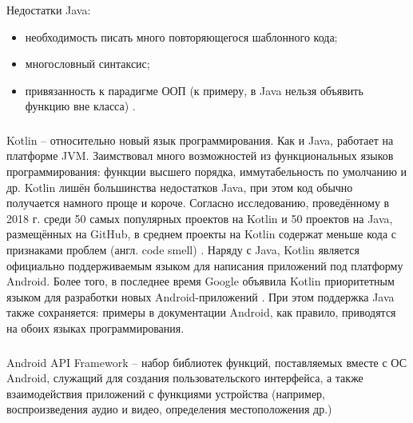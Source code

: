 Недостатки Java:
\begin{itemize}
	\item необходимость писать много повторяющегося шаблонного кода;
	\item многословный синтаксис;
	\item привязанность к парадигме ООП (к примеру, в Java нельзя объявить функцию вне класса) \cite{java_in_21_minutes}.
\end{itemize}

\subsubsection{}
\label{subsub:theory_and_motivation:tools:kotlin}

Kotlin -- относительно новый язык программирования.
Как и Java, работает на платформе JVM.
Заимствовал много возможностей из функциональных языков программирования: функции высшего порядка, иммутабельность по умолчанию и др.
Kotlin лишён большинства недостатков Java, при этом код обычно получается намного проще и короче.
Согласно исследованию, проведённому в 2018 г. среди 50 самых популярных проектов на Kotlin и 50 проектов на Java, размещённых на GitHub, в среднем проекты на Kotlin содержат меньше кода с признаками проблем (англ. code smell) \cite{java_vs_kotlin_2018}.
Наряду с Java, Kotlin является официально поддерживаемым языком для написания приложений под платформу Android.
Более того, в последнее время Google объявила Kotlin приоритетным языком для разработки новых Android-приложений \cite{android_kotlin_first}.
При этом поддержка Java также сохраняется: примеры в документации Android, как правило, приводятся на обоих языках программирования.

\subsubsection{}
\label{subsub:theory_and_motivation:tools:android_api_framework}

Android API Framework -- набор библиотек функций, поставляемых вместе с ОС Android, служащий для создания пользовательского интерфейса, а также взаимодействия приложений с функциями устройства (например, воспроизведения аудио и видео, определения местоположения др.)

\subsubsection{}
\label{subsub:theory_and_motivation:tools:gradle}

